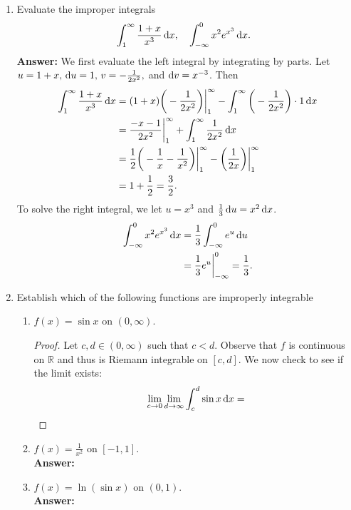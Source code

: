 \documentclass{article}
\begin{document}
\begin{enumerate}
        \item Evaluate the improper integrals
        \begin{align*}
            &\int_1^\infty \frac{1+x}{x^3} \dif x,      &     &\int_{-\infty}^0 x^2e^{x^3} \dif x.
        \end{align*}
        \textbf{Answer: }We first evaluate the left integral by integrating by parts. Let $u=1+x, \, \dif u = 1, \, v = -\frac{1}{2x^2},$ and $\dif v = x^{-3}$. Then
        \begin{align*}
            \int_1^\infty \frac{1+x}{x^3} \dif x &= (1+x)\bigg(-\frac{1}{2x^2}\bigg)\bigg|_1^\infty - \int_1^\infty \bigg(-\frac{1}{2x^2}\bigg) \cdot 1 \dif x\\
            &= \frac{-x-1}{2x^2} \bigg|_1^\infty + \int_1^\infty\frac{1}{2x^2}\dif x\\
            &= \frac{1}{2}\bigg(-\frac{1}{x} -\frac{1}{x^2}\bigg)\bigg|_1^\infty - \bigg(\frac{1}{2x}\bigg)\bigg|_1^\infty\\
            &= 1+\frac{1}{2} = \frac{3  }{2}.
        \end{align*}
        To solve the right integral, we let $u=x^3$ and $\frac{1}{3}\dif u = x^2 \dif x$.
            \begin{align*}
                \int_{-\infty}^0 x^2e^{x^3} \dif x &= \frac{1}{3} \int_{-\infty}^0 e^u \dif u\\
                &= \frac{1}{3}e^u\bigg|_{-\infty}^0 = \frac{1}{3}.
            \end{align*}
        
        \item Establish which of the following functions are improperly integrable
        \begin{enumerate}
            \item $f(x) = \sin x$ on $(0,\infty)$.\\
                \begin{proof}
                    Let $c,d \in (0, \infty)$ such that $c < d$. Observe that $f$ is continuous on $\mathbb{R}$ and thus is Riemann integrable on $[c,d]$. We now check to see if the limit exists:
                        \begin{align*}
                            \lim_{c \to 0} \lim_{d \to \infty} \int_c^d \sin x \dif x = 
                        \end{align*}
                    
                \end{proof}
            
            \item $f(x) = \frac{1}{x^2}$ on $[-1,1]$.\\
            \textbf{Answer: }\\
            
            \item $f(x) = \ln(\sin x)$ on $(0,1)$.\\
            \textbf{Answer: }
        \end{enumerate}
    \end{enumerate}
\end{document}
